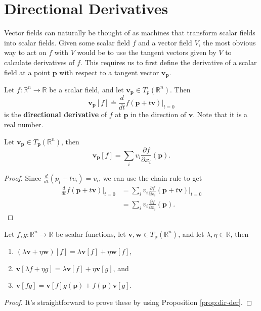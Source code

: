 \documentclass[10pt]{report}
\begin{document}

\section{Directional Derivatives}

Vector fields can naturally be thought of as machines that transform scalar fields into scalar fields. Given some scalar field $f$ and a vector field $V$, the most obvious way to act on $f$ with $V$ would be to use the tangent vectors given by $V$ to calculate derivatives of $f$. This requires us to first define the derivative of a scalar field at a point $\mathbf{p}$ with respect to a tangent vector $\mathbf{v}_\mathbf{p}$.

\begin{defn}
	Let $f:\mathbb{R}^n \to \mathbb{R}$ be a scalar field, and let $\mathbf{v}_{\mathbf{p}} \in T_p(\mathbb{R}^n)$. Then
	\[
		\mathbf{v}_{\mathbf{p}}[f] \doteq \frac{d }{d t} f(\mathbf{p}+t\mathbf{v}) \Big|_{t=0}
\] is the \textbf{directional derivative} of $f$ at $\mathbf{p}$ in the direction of $\mathbf{v}$. Note that it is a real number.
\end{defn}

\begin{prop}
	\label{prop:dir-der}
	Let $\mathbf{v}_\mathbf{p} \in T_\mathbf{p}(\mathbb{R}^n)$, then
	\[
		\mathbf{v}_{\mathbf{p}}[f] = \sum_i v_i \frac{\partial f}{\partial x_i} (\mathbf{p}).
	\] 
\end{prop}
\begin{proof}
	Since $\frac{d }{d t} (p_i + tv_i) = v_i$, we can use the chain rule to get
	\begin{align*}
		\frac{d }{d t} f(\mathbf{p}+t\mathbf{v}) \Big|_{t=0} &= \sum_{i} v_i \frac{\partial f}{\partial x_i} (\mathbf{p}+t\mathbf{v}) \Big|_{t=0} \\
						   &= \sum_i v_i \frac{\partial f}{\partial x_i} (\mathbf{p}).
	\end{align*}
\end{proof}

\begin{thrm}
	\label{thrm:props-of-dir-der}
	Let $f,g:\mathbb{R}^n \to \mathbb{R}$ be scalar functions, let $\mathbf{v},\mathbf{w} \in T_\mathbf{p}(\mathbb{R}^n)$, and let $\lambda,\eta\in\mathbb{R}$, then
	\begin{enumerate}
		\item $(\lambda \mathbf{v} + \eta \mathbf{w})[f] = \lambda \mathbf{v}[f] + \eta \mathbf{w}[f]$,
		\item $\mathbf{v}[\lambda f + \eta g] = \lambda \mathbf{v}[f] + \eta \mathbf{v}[g]$, and
		\item $\mathbf{v}[fg] = \mathbf{v}[f] g(\mathbf{p}) + f(\mathbf{p}) \mathbf{v}[g]$.
	\end{enumerate}
\end{thrm}
\begin{proof}
	It's straightforward to prove these by using Proposition \ref{prop:dir-der}.
\end{proof}
\end{document}
